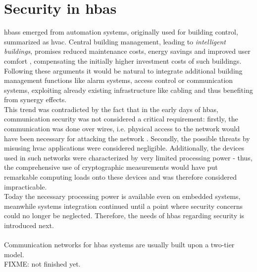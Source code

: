 \section{Security in \gls{hbas}}\label{hbaSec}
\glspl{hbas} emerged from automation systems, originally used for building control, summarized as \gls{hvac}.
Central building management, leading to \textit{intelligent buildings}, promises
reduced maintenance costs, energy savings and improved user comfort \cite{1435745}, compensating the initially higher investment costs of such buildings.
Following these arguments it would be natural to integrate additional building management functions like alarm systems, access control or communication systems,
exploiting already existing infrastructure like cabling and thus benefiting from synergy effects.
\\
This trend was contradicted by the fact that in the early days of \gls{hbas}, communication security was not considered a critical requirement:
firstly, the communication was done over wires,
i.e. physical access to the network would have been necessary for attacking the network \cite{knxSpec}. Secondly, the possible threats by misusing \gls{hvac} applications
were considered negligible. Additionally, the devices used in such networks were characterized by very limited processing power - thus, the comprehensive
use of cryptographic measurements would have put remarkable computing loads onto these devices and was therefore considered impracticable.
\\
Today the necessary processing power is available even on embedded systems, meanwhile systems integration continued until a point where security concerns could
no longer be neglected. Therefore, the needs of \gls{hbas} regarding security is introduced next.
\\
\\
Communication networks for \gls{hbas} systems are usually built upon a two-tier model.
\\
FIXME: not finished yet.
